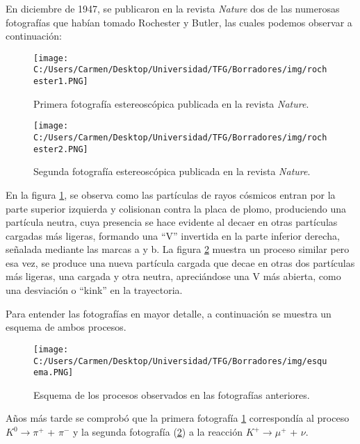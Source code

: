 En diciembre de 1947, se publicaron en la revista \textit{Nature} dos de las numerosas fotografías que habían tomado Rochester y Butler, las cuales podemos observar a continuación:

\begin{figure}[h!]
	\centering
	\texttt{[image: C:/Users/Carmen/Desktop/Universidad/TFG/Borradores/img/rochester1.PNG]}
	\caption[Fotografía 1 de la primera detección de los mesones $K$]
	{Primera fotografía estereoscópica publicada en la revista \textit{Nature}. \cite{Nature1}}
	\label{fig:nature1}
\end{figure}
\begin{figure}[h!]
	\centering
	\texttt{[image: C:/Users/Carmen/Desktop/Universidad/TFG/Borradores/img/rochester2.PNG]}
	\caption[Fotografía 2 de la primera detección de los mesones $K$]
	{Segunda fotografía estereoscópica publicada en la revista \textit{Nature}. \cite{Nature1}}
	\label{fig:nature2}
\end{figure}

En la figura \ref{fig:nature1}, se observa como las partículas de rayos cósmicos entran por la parte superior izquierda y colisionan contra la placa de plomo, produciendo una partícula neutra, cuya presencia se hace evidente al decaer en otras partículas cargadas más ligeras, formando una ``V'' invertida en la parte inferior derecha, señalada mediante las marcas a y b. La figura \ref{fig:nature2} muestra un proceso similar pero esa vez, se produce una nueva partícula cargada que decae en otras dos partículas más ligeras, una cargada y otra neutra, apreciándose una V más abierta, como una desviación o ``kink'' en la trayectoria.

Para entender las fotografías en mayor detalle, a continuación se muestra un esquema de ambos procesos.

\begin{figure}[h!]
	\centering
	\texttt{[image: C:/Users/Carmen/Desktop/Universidad/TFG/Borradores/img/esquema.PNG]}
	\caption[Esquema para entender las fotos estereoscópicas]
	{Esquema de los procesos observados en las fotografías anteriores. \cite{Franzini}}
	\label{fig:esquema1}
\end{figure}

Años más tarde se comprobó que la primera fotografía \ref{fig:nature1} correspondía al proceso  $K^0 \rightarrow \pi^+$ +  $\pi^- $ y la segunda fotografía (\ref{fig:nature2}) a la reacción $K^+ \rightarrow \mu^+$ + $\nu $.

